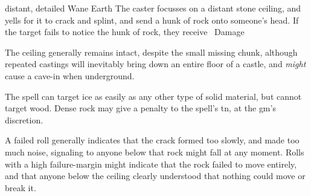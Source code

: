   {distant, detailed}%
  {Wane}%
  {Earth}%
  {}%
  {The caster focusses on a distant stone ceiling, and yells for it to crack and splint, and send a hunk of rock onto someone's head.
    If the target fails to notice the hunk of rock, they receive \showDam\ Damage}%
  {
    The ceiling generally remains intact, despite the small missing chunk, although repeated castings will inevitably bring down an entire floor of a castle, and \emph{might} cause a cave-in when underground.

    The spell can target ice as easily as any other type of solid material, but cannot target wood.
    Dense rock may give a penalty to the spell's \gls{tn}, at the \gls{gm}'s discretion.

    A failed roll generally indicates that the crack formed too slowly, and made too much noise, signaling to anyone below that rock might fall at any moment.
    Rolls with a high failure-margin might indicate that the rock failed to move entirely, and that anyone below the ceiling clearly understood that nothing could move or break it.
  }

